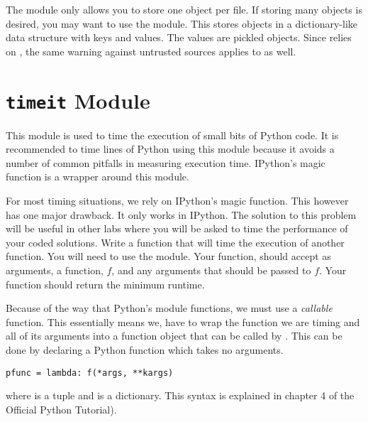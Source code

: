 The  module only allows you to store one object per file.
If storing many objects is desired, you may want to use the  module.
This stores objects in a dictionary-like data structure with keys and values.
The values are pickled objects.  Since  relies on , the
same warning against untrusted sources applies to  as well.

\section*{\texttt{timeit} Module}
This module is used to time the execution of small bits of Python code.
It is recommended to time lines of Python using this module because it avoids a number of common pitfalls in measuring execution time.  IPython's  magic function is a wrapper around this module.  

\begin{problem}
For most timing situations, we rely on IPython's  magic function.
This however has one major drawback.  It only works in IPython.
The solution to this problem will be useful in other labs where you will be
asked to time the performance of your coded solutions.
Write a function that will 
time the execution of another function.  You will need to use the  module.
Your function, should accept as arguments, a function, $f$, and any arguments that
should be passed to $f$.  Your function should return the minimum runtime.

Because of the way that Python's  module functions, we must use a \emph{callable}
function.  This essentially means we, have to wrap the function we are timing and all of
its arguments into a function object that can be called by .
This can be done by declaring a Python  function which takes no arguments.
\begin{lstlisting}
pfunc = lambda: f(*args, **kargs)
\end{lstlisting}
where  is a tuple and  is a dictionary.  
This syntax is explained in chapter 4 of the Official Python Tutorial).
\end{problem}


